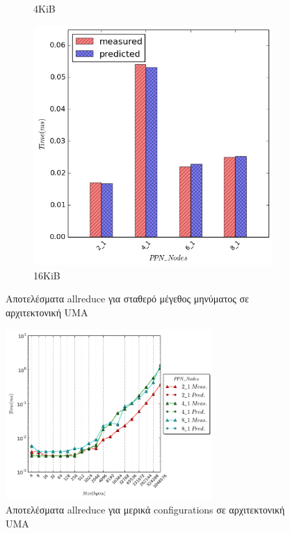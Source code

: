 \begin{figure}[ht]
\begin{subfigure}[b]{0.4\textwidth}
        \caption{4KiB}
    \end{subfigure}
    \quad
        \begin{subfigure}[b]{0.4\textwidth}
        \includegraphics[width=\textwidth]{./images/allreduce/allreduce_16384.png}
        \caption{16KiB}
    \end{subfigure}

    \caption{Αποτελέσματα allreduce για σταθερό μέγεθος μηνύματος σε αρχιτεκτονική UMA}
        \label{fig:allreduce_sizes}
\end{figure}
\begin{figure}[ht]
    \centering
     \captionsetup{justification=centering,margin=0cm,font=footnotesize}
    \includegraphics[width=0.7\textwidth]{./images/allreduce/allreduce.png}
    \caption{Αποτελέσματα allreduce για μερικά configurations σε αρχιτεκτονική UMA}
    \label{fig:allreduce_conf}
\end{figure}

